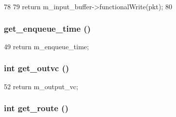 \begin{DoxyCode}
78 {
79     return m_input_buffer->functionalWrite(pkt);
80 }
\end{DoxyCode}
\hypertarget{classVirtualChannel__d_a8b7947d2d5ef2f4c39d644d6b8070acb}{
\subsubsection[{get\_\-enqueue\_\-time}]{ get\_\-enqueue\_\-time ()}}
\label{classVirtualChannel__d_a8b7947d2d5ef2f4c39d644d6b8070acb}



\begin{DoxyCode}
49 { return m_enqueue_time; }
\end{DoxyCode}
\hypertarget{classVirtualChannel__d_a24b86446f92393208caa8f73c96d121f}{
\subsubsection[{get\_\-outvc}]{\setlength{\rightskip}{0pt plus 5cm}int get\_\-outvc ()}}
\label{classVirtualChannel__d_a24b86446f92393208caa8f73c96d121f}



\begin{DoxyCode}
52 { return m_output_vc; }
\end{DoxyCode}
\hypertarget{classVirtualChannel__d_a4cafbc86e146cbf615a6045d5059a420}{
\subsubsection[{get\_\-route}]{\setlength{\rightskip}{0pt plus 5cm}int get\_\-route ()}}
\label{classVirtualChannel__d_a4cafbc86e146cbf615a6045d5059a420}



